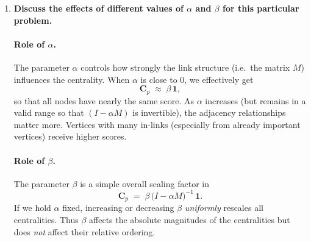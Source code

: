 \documentclass[a4paper,12pt]{article}
\begin{document}
\begin{enumerate}
Carrying out this multiplication numerically, we get
\[
\mathbf{x} 
\;\approx\; 
\bigl(1.12,\;1.17,\;1.58,\;1.53,\;1.76\bigr).
\]
Finally, we multiply by \(\beta = 0.5\):
\[
\mathbf{C}_p 
\;=\;
0.5 \,\mathbf{x}
\;\approx\;
\bigl(0.56,\;0.59,\;0.79,\;0.77,\;0.88\bigr).
\]

Hence the approximate centralities for \(\alpha=0.3\), \(\beta=0.5\) are
\[
C_1 \approx 0.56,\quad
C_2 \approx 0.59,\quad
C_3 \approx 0.79,\quad
C_4 \approx 0.77,\quad
C_5 \approx 0.88.
\]
In order (from largest to smallest), the ranking is 
\[
v_5 > v_3 > v_4 > v_2 > v_1.
\]

\subsubsection*{(c) Case 2: \(\alpha = 0,\;\beta = 1\)}

Now
\[
\mathbf{C}_p
\;=\;
\beta\,(I - \alpha\,M)^{-1}\,\mathbf{1}
\;=\;
1\cdot (I - 0\cdot M)^{-1}\,\mathbf{1}
\;=\;
I^{-1}\,\mathbf{1}
\;=\;
\mathbf{1}.
\]
Hence each node has centrality \(1\).  The centralities are all equal:
\[
\mathbf{C}_p 
\;=\;
(1,\,1,\,1,\,1,\,1).
\]

\bigskip

\item \textbf{Discuss the effects of different values of $\alpha$ and $\beta$ for this particular problem.}

\paragraph{Role of $\alpha$.}
The parameter $\alpha$ controls how strongly the link structure (i.e.\ the matrix $M$) influences the centrality.  When $\alpha$ is close to $0$, we effectively get
\[
\mathbf{C}_p \;\approx\; \beta\,\mathbf{1},
\]
so that all nodes have nearly the same score.  As $\alpha$ increases (but remains in a valid range so that $(I-\alpha M)$ is invertible), the adjacency relationships matter more.  Vertices with many in-links (especially from already important vertices) receive higher scores.

\paragraph{Role of $\beta$.}
The parameter $\beta$ is a simple overall scaling factor in
\[
\mathbf{C}_p 
\;=\; 
\beta\,\bigl(I - \alpha M\bigr)^{-1}\,\mathbf{1}.
\]
If we hold $\alpha$ fixed, increasing or decreasing $\beta$ \emph{uniformly} rescales all centralities.  Thus $\beta$ affects the absolute magnitudes of the centralities but does \emph{not} affect their relative ordering.


\end{enumerate}
\end{document}
